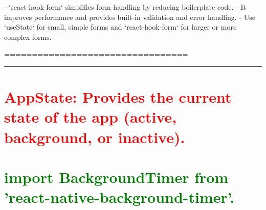 \documentclass[12pt]{article}
\begin{document}
- `react-hook-form` simplifies form handling by reducing boilerplate code.
- It improves performance and provides built-in validation and error handling.
- Use `useState` for small, simple forms and `react-hook-form` for larger or more complex forms.

=================================
\hrule

\section*{\textcolor{red}{\textbf{AppState: Provides the current state of the app (active, background, or inactive).
}}}
\section*{\textcolor{green}{\textbf{import BackgroundTimer from 'react-native-background-timer'.
}}}



\end{document}
